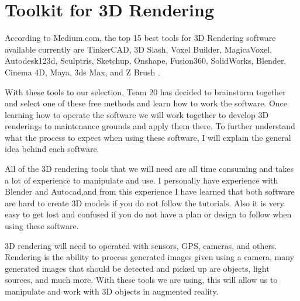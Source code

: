 \documentclass[a4paper, 11pt]{article} %
\begin{document}

\section{Toolkit for 3D Rendering}
	According to Medium.com, the top 15 best tools for 3D Rendering software available currently are TinkerCAD, 3D Slash, Voxel Builder, MagicaVoxel, Autodesk123d, Sculptris, Sketchup, Onshape, Fusion360, SolidWorks, Blender, Cinema 4D, Maya, 3ds Max, and Z Brush \cite{Medium:2018}.

With these tools to our selection, Team 20 has decided to brainstorm together and select one of these free methods and learn how to work the software. Once learning how to operate the software we will work together to develop 3D renderings to maintenance grounds and apply them there. To further understand what the process to expect when using these software, I will explain the general idea behind each software.

All of the 3D rendering tools that we will need are all time consuming and takes a lot of experience to manipulate and use. I personally have experience with Blender and Autocad,and from this experience I have learned that both software are hard to create 3D models if you do not follow the tutorials. Also it is very easy to get lost and confused if you do not have a plan or design to follow when using these software.

3D rendering will need to operated with sensors, GPS, cameras, and others. Rendering is the ability to process generated images given using a camera, many generated images that should be detected and picked up are objects, light sources, and much more. With these tools we are using, this will allow us to manipulate and work with 3D objects in augmented reality.
\end{document}
